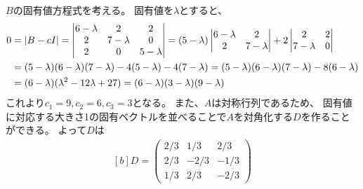 \documentclass[../ap_2011.tex]{subfiles}
\begin{document}
\section{}
\(B\)の固有値方程式を考える。
固有値を\(\lambda\)とすると、
\begin{equation}\begin{aligned}[b]
    0 &= \abs{B-cI}
    =\begin{vmatrix}
        6-\lambda & 2 & 2\\
        2 & 7-\lambda & 0\\
        2 & 0 & 5-\lambda
    \end{vmatrix}
    =(5-\lambda)\begin{vmatrix}
        6-\lambda & 2 \\
        2 & 7-\lambda
    \end{vmatrix}
    +2\begin{vmatrix}
        2 & 2\\
        7-\lambda & 0
    \end{vmatrix}\\
    &=(5-\lambda)(6-\lambda)(7-\lambda)-4(5-\lambda)-4(7-\lambda)
    =(5-\lambda)(6-\lambda)(7-\lambda)-8(6-\lambda)\\
    &=(6-\lambda)(\lambda^2-12\lambda+27)=(6-\lambda)(3-\lambda)(9-\lambda)
\end{aligned}\end{equation}
これより\(c_1=9,c_2=6,c_3=3\)となる。
また、\(A\)は対称行列であるため、
固有値に対応する大きさ1の固有ベクトルを並べることで\(A\)を対角化する\(D\)を作ることができる。
よって\(D\)は
\begin{equation}\begin{aligned}[b]
    D =\begin{pmatrix}
        2/3&1/3&2/3\\
        2/3&-2/3&-1/3\\
        1/3&2/3&-2/3
    \end{pmatrix}
\end{aligned}\end{equation}
\end{document}
